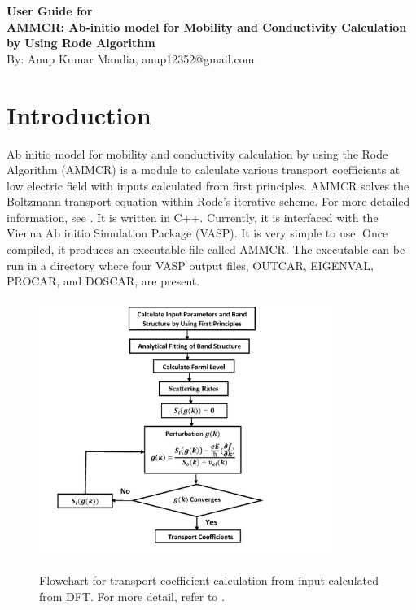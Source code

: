 \documentclass[12pt]{article}
\date{}
\begin{document}
\begin{titlepage}
\begin{center}
\Huge
\textbf{User Guide for \\
AMMCR: Ab-initio model for Mobility and Conductivity Calculation by Using Rode Algorithm\\} 
\vspace{5mm}
\Large 
By: Anup Kumar Mandia, anup12352@gmail.com
\end{center}
\end{titlepage}
  
\tableofcontents

\newpage
  
\section{Introduction}
Ab initio model for mobility and conductivity calculation by using the Rode Algorithm (AMMCR) is a module to calculate various transport coefficients at low electric field with inputs calculated from first principles. AMMCR solves the Boltzmann transport equation within Rode's iterative scheme. For more detailed information, see \cite{anup1,anup2,anup3, koshi2023}. It is written in C++. Currently, it is interfaced with the Vienna Ab initio Simulation Package (VASP). It is very simple to use. Once compiled, it produces an executable file called AMMCR. The executable can be run in a directory where four VASP output files, OUTCAR, EIGENVAL, PROCAR, and DOSCAR, are present. \\

\begin{figure}[!t]
	\centering
	{\includegraphics[height=0.85\textwidth,width=0.85\textwidth]{flowchart.pdf}}
	\quad
	\caption{Flowchart for transport coefficient calculation from input calculated from DFT. For more detail, refer to \cite{anup1, anup2, anup3}. }
	\label{flowchart}
\end{figure}
\end{document}
